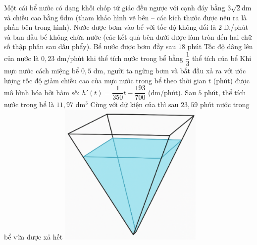 \begin{ex}%
\immini
{
    Một cái bể nước có dạng khối chóp tứ giác đều ngược với cạnh đáy bằng $3\sqrt{2}$dm và chiều cao bằng $6$dm (tham khảo hình vẽ bên – các kích thước được nêu ra là phần bên trong hình). Nước được bơm vào bể với tốc độ không đổi là $2$ lít/phút và ban đầu bể không chứa nước (các kết quả bên dưới được làm tròn đến hai chữ số thập phân sau dấu phẩy).
    \choiceTF
    {\True Bể nước được bơm đầy sau $18$ phút}
    {\True Tốc độ dâng lên của nước là $0{,}23$ dm/phút khi thể tích nước trong bể bằng $\dfrac{1}{3}$ thể tích của bể}
    {\True Khi mực nước cách miệng bể $0{,}5$ dm, người ta ngừng bơm và bắt đầu xả ra với ước lượng tốc độ giảm chiều cao của mực nước trong bể theo thời gian $t$ (phút) được mô hình hóa bởi hàm số: $h'(t)=\dfrac{1}{350}t-\dfrac{193}{700}$ (dm/phút). Sau $5$ phút, thể tích nước trong bể là $11,97$ dm$^3$}
    {Cùng với dữ kiện của  thì sau $23{,}59$ phút nước trong bể vừa được xả hết}
}
{
    \includegraphics[width=7cm]{img/HXN-2-13}
}
\end{ex}

